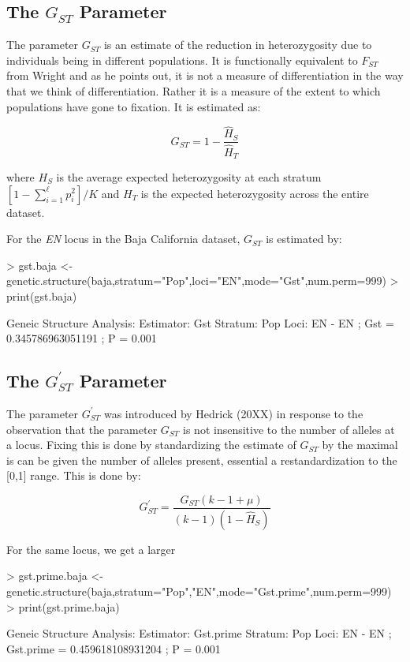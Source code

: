\documentclass[letterpaper,twoside,openany]{book}
\begin{document}
\subsection{The $G_{ST}$ Parameter}

The parameter $G_{ST}$ is an estimate of the reduction in heterozygosity due to individuals being in different populations.  It is functionally equivalent to $F_{ST}$ from Wright and as he points out, it is not a measure of differentiation in the way that we think of differentiation.  Rather it is a measure of the extent to which populations have gone to fixation.  It is estimated as: 

\[
G_{ST} = 1 - \frac{\hat{H}_S}{\hat{H}_T}
\]

where $H_S$ is the average expected heterozygosity at each stratum $[1-\sum_{i=1}^\ell p_i^2]/K$ and $H_T$ is the expected heterozygosity across the entire dataset.  

For the \emph{EN} locus in the Baja California dataset, $G_{ST}$ is estimated by:

\begin{Schunk}
\begin{Sinput}
> gst.baja <- genetic.structure(baja,stratum="Pop",loci="EN",mode="Gst",num.perm=999)
> print(gst.baja)
\end{Sinput}
\begin{Soutput}
Geneic Structure Analysis:
  Estimator: Gst 
  Stratum: Pop 
  Loci: { EN }
   - EN ;  Gst = 0.345786963051191 ; P = 0.001 
\end{Soutput}
\end{Schunk}

\subsection{The $G_{ST}^\prime$ Parameter}

The parameter $G_{ST}^\prime$ was introduced by Hedrick (20XX) in response to the observation that the parameter $G_{ST}$ is not insensitive to the number of alleles at a locus.  Fixing this is done by standardizing the estimate of $G_{ST}$ by the maximal is can be given the number of alleles present, essential a restandardization to the [0,1] range.  This is done by:

\[
G_{ST}^\prime = \frac{G_{ST}(k-1+\mu)}{(k-1)(1-\hat{H}_S)}
\]

For the same locus, we get a larger

\begin{Schunk}
\begin{Sinput}
> gst.prime.baja <- genetic.structure(baja,stratum="Pop","EN",mode="Gst.prime",num.perm=999)
> print(gst.prime.baja)
\end{Sinput}
\begin{Soutput}
Geneic Structure Analysis:
  Estimator: Gst.prime 
  Stratum: Pop 
  Loci: { EN }
   - EN ;  Gst.prime = 0.459618108931204 ; P = 0.001 
\end{Soutput}
\end{Schunk}
\end{document}
